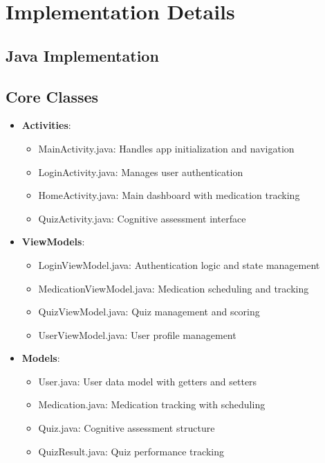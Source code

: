 \section{Implementation Details}
\subsection{Java Implementation}
\subsection{Core Classes}
\begin{itemize}
    \item \textbf{Activities}:
    \begin{itemize}
        \item MainActivity.java: Handles app initialization and navigation
        \item LoginActivity.java: Manages user authentication
        \item HomeActivity.java: Main dashboard with medication tracking
        \item QuizActivity.java: Cognitive assessment interface
    \end{itemize}
    
    \item \textbf{ViewModels}:
    \begin{itemize}
        \item LoginViewModel.java: Authentication logic and state management
        \item MedicationViewModel.java: Medication scheduling and tracking
        \item QuizViewModel.java: Quiz management and scoring
        \item UserViewModel.java: User profile management
    \end{itemize}
    
    \item \textbf{Models}:
    \begin{itemize}
        \item User.java: User data model with getters and setters
        \item Medication.java: Medication tracking with scheduling
        \item Quiz.java: Cognitive assessment structure
        \item QuizResult.java: Quiz performance tracking
    \end{itemize}
\end{itemize}

